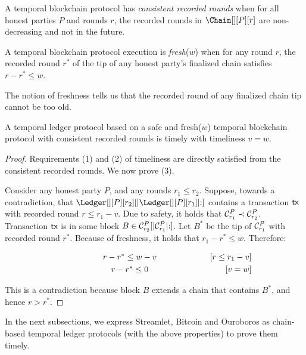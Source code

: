 \begin{definition}
  A temporal blockchain protocol has \emph{consistent recorded rounds}
  when for all honest parties $P$ and rounds $r$,
  the recorded rounds in $\Chain[][P][r]$ are non-decreasing and not
  in the future.
\end{definition}

\begin{definition}[Freshness] \label{def:tip-freshness}
  A temporal blockchain protocol execution is \emph{fresh}($w$) when for
  any round $r$, the recorded round
  $r^*$ of the tip of any honest party's finalized chain
  satisfies $r - r^* \leq w$.
\end{definition}

The notion of freshness tells us that the recorded round
of any finalized chain tip cannot be too old.

\begin{theorem} \label{thm:freshness-to-timeliness}
  A temporal ledger protocol based on a safe and fresh($w$)
  temporal blockchain protocol with consistent recorded rounds is timely with timeliness $v = w$.
\end{theorem}
\begin{proof}
  Requirements (1) and (2) of timeliness are directly satisfied from
  the consistent recorded rounds.
  We now prove (3).

  Consider any honest party $P$, and any rounds $r_1 \leq r_2$.
  Suppose, towards a contradiction, that $\Ledger[][P][r_2][|\Ledger[][P][r_1]|{:}]$
  contains a transaction $\textsf{tx}$ with recorded round $r \leq r_1 - v$.
  Due to safety, it holds that $\mathcal{C}^P_{r_1} \prec \mathcal{C}^P_{r_2}$.
  Transaction $\textsf{tx}$ is in some block $B \in \mathcal{C}^P_{r_2}[|\mathcal{C}^P_{r_1}|{:}]$.
  Let $B^*$ be the tip of $\mathcal{C}^P_{r_1}$ with recorded round $r^*$.
  Because of freshness, it holds that $r_1 - r^* \leq w$.
  Therefore:

  \begin{align*}
    \makebox[0.5\textwidth][c]{$r - r^* \leq w - v$}         && \text{[$r \leq r_1 - v$]} \\
    \makebox[0.5\textwidth][c]{$r - r^* \leq 0$}             && \text{[$v = w$]}
  \end{align*}

  This is a contradiction because block $B$ extends a chain that contains $B^*$,
  and hence $r > r^*$.
  \Qed
\end{proof}

In the next subsections, we express Streamlet, Bitcoin and Ouroboros
as chain-based temporal ledger protocols (with the above properties) to
prove them timely.
